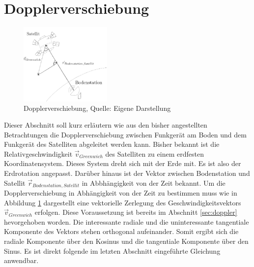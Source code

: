 \section{Dopplerverschiebung}
\begin{figure}[h]                                                                           %
	\centering                                                                            	%
	\includegraphics[width=0.4\textwidth]{./images/doppler.jpg}              			    %
	\caption[Dopplerverschiebung]{Dopplerverschiebung, Quelle: Eigene  Darstellung}                        													%
	\label{fig:doppler}                                                                        %
\end{figure}                                                                              	%
Dieser Abschnitt soll kurz erläutern wie aus den bisher angestellten Betrachtungen die Dopplerverschiebung zwischen Funkgerät am Boden und dem Funkgerät des Satelliten abgeleitet werden kann. Bisher bekannt ist die Relativgeschwindigkeit \ensuremath{\vec{v}_{Greenwich}} des Satelliten zu einem erdfesten Koordinatensystem. Dieses System dreht sich mit der Erde mit. Es ist also der Erdrotation angepasst. Darüber hinaus ist der Vektor zwischen Bodenstation und Satellit \ensuremath{\vec{r}_{Bodenstation,Satellit}} in Abbhängigkeit von der Zeit bekannt. 
\newpar
Um die Dopplerverschiebung in Abhängigkeit von der Zeit zu bestimmen muss wie in Abbildung \ref{fig:doppler} dargestellt eine vektorielle Zerlegung des Geschwindigkeitsvektors \ensuremath{\vec{v}_{Greenwich}} erfolgen. Diese Voraussetzung ist bereits im Abschnitt \ref{sec:doppler} hevorgehoben worden. Die interessante radiale und die uninteressante tangentiale Komponente des Vektors stehen orthogonal aufeinander. Somit ergibt sich die radiale Komponente über den Kosinus und die tangentiale Komponente über den Sinus. Es ist direkt folgende im letzten Abschnitt eingeführte Gleichung anwendbar.      
